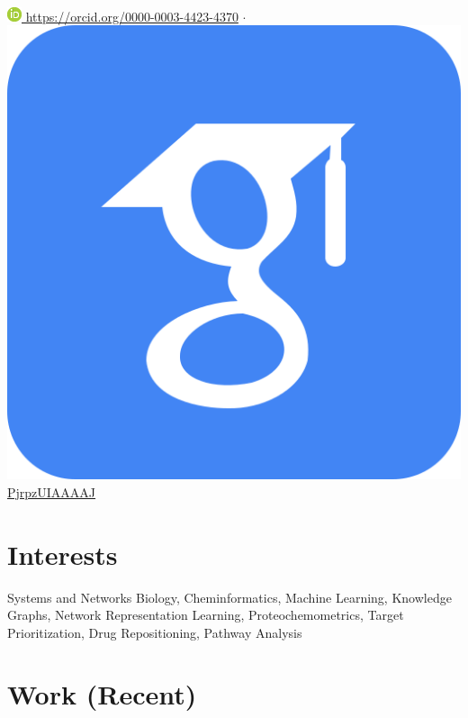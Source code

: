 \documentclass[11pt,a4paper,sans]{moderncv} %
\begin{document}
\\
\href{https://orcid.org/0000-0003-4423-4370}{\includegraphics[scale=0.5]{img/ORCIDiD_icon16x16} https://orcid.org/0000-0003-4423-4370}
$\cdot$
\href{https://scholar.google.com/citations?user=PjrpzUIAAAAJ&hl=en}{\includegraphics[scale=0.015625]{img/google_scholar_icon_130918} PjrpzUIAAAAJ}

\section{Interests}\label{sec:interests}

Systems and Networks Biology, Cheminformatics, Machine Learning, Knowledge Graphs, Network Representation Learning, Proteochemometrics, Target Prioritization, Drug Repositioning, Pathway Analysis


\section{Work (Recent)}\label{sec:work}

\end{document}
